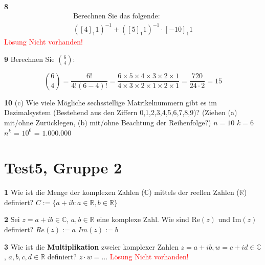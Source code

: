 \documentclass[11pt]{article}
\begin{document}
    \textbf{8} \[
                   \begin{gathered}
                       \text{Berechnen Sie das folgende:} \\
                       \left([4]_1 1\right)^{-1} + \left([5]_1 1\right)^{-1} \cdot [-10]_1 1
                   \end{gathered}
    \]\newline
    \textcolor{red}{Lösung Nicht vorhanden!}\newline

    \textbf{9} Berechnen Sie \(\binom{6}{4}\):

    \[
        \binom{6}{4} = \frac{6!}{4!(6-4)!} = \frac{6 \times 5 \times 4 \times 3 \times 2 \times 1}{4 \times 3 \times 2 \times 1 \times 2 \times 1} = \frac{720}{24 \cdot 2} = 15
    \]\newline


    \textbf{10} (c) Wie viele Mögliche sechsstellige Matrikelnummern gibt es im Dezimalsystem (Bestehend aus den Ziffern {0,1,2,3,4,5,6,7,8,9})? (Ziehen (a) mit/ohne Zurücklegen, (b) mit/ohne Beachtung der Reihenfolge?)\newline
    $n = 10$\newline
    $k = 6$
    $n^{k}$ = $10^{6}$ = $1.000.000$

\section{Test5, Gruppe 2}

    \textbf{1} Wie ist die Menge der komplexen Zahlen (\(\mathbb{C}\)) mittels der reellen Zahlen (\(\mathbb{R}\)) definiert?\newline
    $C := \{ a + ib : a \in \mathbb{R}, b \in \mathbb{R} \}$\newline

    \textbf{2} Sei \( z = a + ib \in \mathbb{C} \), \( a,b \in \mathbb{R} \) eine komplexe Zahl. Wie sind \( \text{Re}(z) \) und \( \text{Im}(z) \) definiert?\newline
    $Re(z) := a$\newline
    $Im(z) := b$\newline

    \textbf{3} Wie ist die \textbf{Multiplikation} zweier komplexer Zahlen \( z = a + ib, w = c + id \in \mathbb{C} \), \( a,b,c,d \in \mathbb{R} \) definiert? \( z \cdot w = \ldots \)\newline
    \textcolor{red}{Lösung Nicht vorhanden!}\newline
\end{document}

